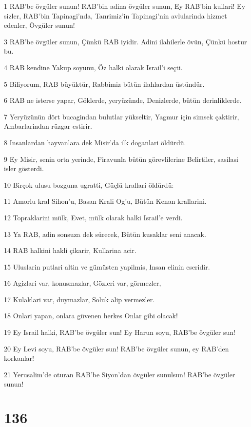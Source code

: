 \par 1 RAB'be övgüler sunun! RAB'bin adina övgüler sunun, Ey RAB'bin kullari! Ey sizler, RAB'bin Tapinagi'nda, Tanrimiz'in Tapinagi'nin avlularinda hizmet edenler, Övgüler sunun!
\par 3 RAB'be övgüler sunun, Çünkü RAB iyidir. Adini ilahilerle övün, Çünkü hostur bu.
\par 4 RAB kendine Yakup soyunu, Öz halki olarak Israil'i seçti.
\par 5 Biliyorum, RAB büyüktür, Rabbimiz bütün ilahlardan üstündür.
\par 6 RAB ne isterse yapar, Göklerde, yeryüzünde, Denizlerde, bütün derinliklerde.
\par 7 Yeryüzünün dört bucagindan bulutlar yükseltir, Yagmur için simsek çaktirir, Ambarlarindan rüzgar estirir.
\par 8 Insanlardan hayvanlara dek Misir'da ilk doganlari öldürdü.
\par 9 Ey Misir, senin orta yerinde, Firavunla bütün görevlilerine Belirtiler, sasilasi isler gösterdi.
\par 10 Birçok ulusu bozguna ugratti, Güçlü krallari öldürdü:
\par 11 Amorlu kral Sihon'u, Basan Krali Og'u, Bütün Kenan krallarini.
\par 12 Topraklarini mülk, Evet, mülk olarak halki Israil'e verdi.
\par 13 Ya RAB, adin sonsuza dek sürecek, Bütün kusaklar seni anacak.
\par 14 RAB halkini hakli çikarir, Kullarina acir.
\par 15 Uluslarin putlari altin ve gümüsten yapilmis, Insan elinin eseridir.
\par 16 Agizlari var, konusmazlar, Gözleri var, görmezler,
\par 17 Kulaklari var, duymazlar, Soluk alip vermezler.
\par 18 Onlari yapan, onlara güvenen herkes Onlar gibi olacak!
\par 19 Ey Israil halki, RAB'be övgüler sun! Ey Harun soyu, RAB'be övgüler sun!
\par 20 Ey Levi soyu, RAB'be övgüler sun! RAB'be övgüler sunun, ey RAB'den korkanlar!
\par 21 Yerusalim'de oturan RAB'be Siyon'dan övgüler sunulsun! RAB'be övgüler sunun!

\chapter{136}

